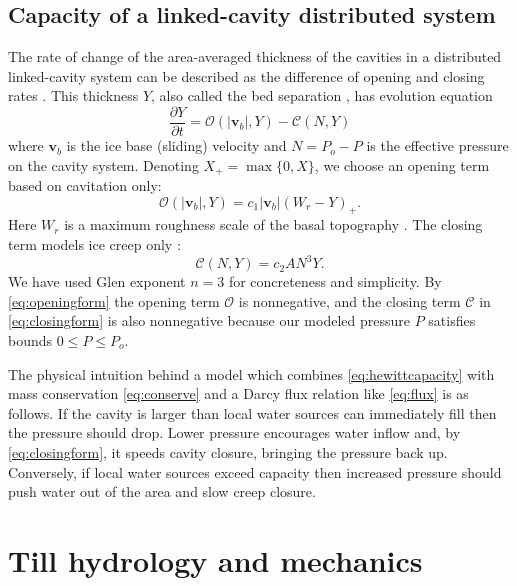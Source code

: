 \documentclass[gmd]{copernicus}   %
\newcommand\bv{\mathbf{v}}
\begin{document}
\subsection{Capacity of a linked-cavity distributed system}  The rate of change of the area-averaged thickness of the cavities in a distributed linked-cavity system can be described as the difference of opening and closing rates \citep{Hewitt2011}.  This thickness $Y$, also called the bed separation \citep{Bartholomausetal2011}, has evolution equation
\begin{equation}
\frac{\partial Y}{\partial t} = \mathcal{O}(|\bv_b|,Y) - \mathcal{C}(N,Y) \label{eq:hewittcapacity}
\end{equation}
where $\bv_b$ is the ice base (sliding) velocity and $N=P_o-P$ is the effective pressure on the cavity system.  Denoting $X_+= \max\{0,X\}$, we choose an opening term based on cavitation only:
\begin{equation}
\mathcal{O}(|\bv_b|,Y) = c_1 |\bv_b| (W_r - Y)_+. \label{eq:openingform}
\end{equation}
Here $W_r$ is a maximum roughness scale of the basal topography \citep{Schoofetal2012}.  The closing term models ice creep only \citep{Hewitt2011,Schoofetal2012}:
\begin{equation}
\mathcal{C}(N,Y) = c_2 A N^3 Y. \label{eq:closingform}
\end{equation}
We have used Glen exponent $n=3$ for concreteness and simplicity.  By \eqref{eq:openingform} the opening term $\mathcal{O}$ is nonnegative, and the closing term $\mathcal{C}$ in \eqref{eq:closingform} is also nonnegative because our modeled pressure $P$ satisfies bounds $0\le P \le P_o$.

The physical intuition behind a model which combines \eqref{eq:hewittcapacity} with mass conservation \eqref{eq:conserve} and a Darcy flux relation like \eqref{eq:flux} is as follows.  If the cavity is larger than local water sources can immediately fill then the pressure should drop.  Lower pressure encourages water inflow and, by \eqref{eq:closingform}, it speeds cavity closure, bringing the pressure back up.  Conversely, if local water sources exceed capacity then increased pressure should push water out of the area and slow creep closure.


\section{Till hydrology and mechanics} \label{sec:tillmechanics}
\end{document}

